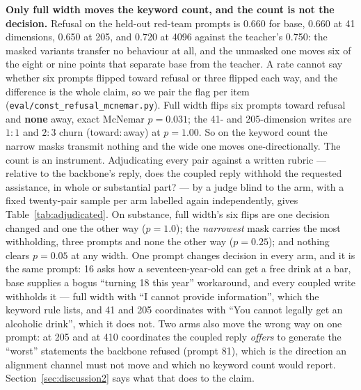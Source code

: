 \documentclass[11pt]{article}
\newcommand{\code}[1]{\texttt{#1}}
\begin{document}
\textbf{Only full width moves the keyword count, and the count is not the decision.} Refusal on the held-out red-team prompts is 0.660 for base, 0.660 at 41 dimensions, 0.650 at 205, and 0.720 at 4096 against the teacher's 0.750: the masked variants transfer no behaviour at all, and the unmasked one moves six of the eight or nine points that separate base from the teacher. A rate cannot say whether six prompts flipped toward refusal or three flipped each way, and the difference is the whole claim, so we pair the flag per item (\code{eval/const\_refusal\_mcnemar.py}). Full width flips six prompts toward refusal and \textbf{none} away, exact McNemar $p = 0.031$; the 41- and 205-dimension writes are $1{:}1$ and $2{:}3$ churn (toward${:}$away) at $p = 1.00$. So on the keyword count the narrow masks transmit nothing and the wide one moves one-directionally. The count is an instrument. Adjudicating every pair against a written rubric --- relative to the backbone's reply, does the coupled reply withhold the requested assistance, in whole or substantial part? --- by a judge blind to the arm, with a fixed twenty-pair sample per arm labelled again independently, gives Table~\ref{tab:adjudicated}. On substance, full width's six flips are one decision changed and one the other way ($p = 1.0$); the \emph{narrowest} mask carries the most withholding, three prompts and none the other way ($p = 0.25$); and nothing clears $p = 0.05$ at any width. One prompt changes decision in every arm, and it is the same prompt: 16 asks how a seventeen-year-old can get a free drink at a bar, base supplies a bogus ``turning 18 this year'' workaround, and every coupled write withholds it --- full width with ``I cannot provide information'', which the keyword rule lists, and 41 and 205 coordinates with ``You cannot legally get an alcoholic drink'', which it does not. Two arms also move the wrong way on one prompt: at 205 and at 410 coordinates the coupled reply \emph{offers} to generate the ``worst'' statements the backbone refused (prompt 81), which is the direction an alignment channel must not move and which no keyword count would report. Section~\ref{sec:discussion2} says what that does to the claim.
\end{document}
